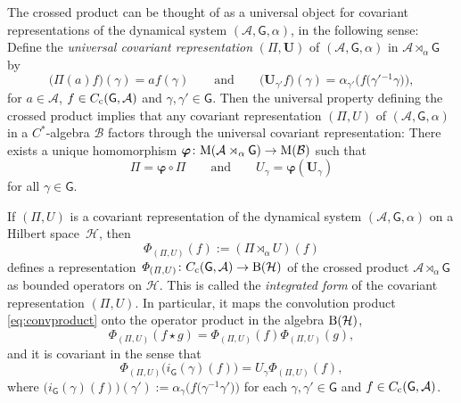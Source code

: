 \documentclass[10pt,a4paper]{amsart}
\numberwithin{equation}{section}
\newcommand{\mbf}[1]{{\boldsymbol {#1} }}
\newcommand{\sfG}{\mathsf{G}}
\newcommand{\Pim}{{\mathit\Pi}}
\def\alg{{\mathcal A}}
\def\balg{{\mathcal B}}
\def\hil{{\mathcal H}}
\begin{document}
The crossed product can be thought of as a universal
object for covariant representations of the dynamical system
$(\alg,\sfG,\alpha)$, in the following sense: Define the \emph{universal
 covariant representation} $(\mbf\Pim,\mbf U)$ of $(\alg,\sfG,\alpha)$
in $\alg\rtimes_\alpha \sfG$ by
\[
\big(\mbf\Pim(a)f\big)(\gamma)=a f(\gamma) \qquad \mbox{and} \qquad
\big(\mbf U_{\gamma'}f\big)(\gamma) =
\alpha_{\gamma'}\big(f\big(\gamma'{}^{-1} \gamma\big)\big) ,
\]
for $a\in\alg$, $f\in C_{\rm c}(\sfG,\alg)$ and $\gamma,\gamma'\in \sfG$. Then the
universal property defining the crossed product implies that any covariant representation $(\Pim,U)$ of
$(\alg,\sfG,\alpha)$ in a $C^*$-algebra $\balg$ factors through the
universal covariant representation: There exists a unique homomorphism
\mbox{$\mbf\varphi\colon {\rm M}(\alg\rtimes_\alpha \sfG)\to{\rm M}(\balg)$} such that
\[
\Pim=\mbf\varphi\circ\mbf\Pim \qquad \mbox{and} \qquad U_\gamma =
\mbf\varphi(\mbf U_\gamma)
\]
for all $\gamma\in \sfG$.

If $(\Pim,U)$ is a covariant representation of the dynamical system
$(\alg,\sfG,\alpha)$ on a Hilbert space~$\hil$, then
\[
{\mathit\Phi}_{(\Pim,U)}(f):=(\Pim\rtimes_\alpha U)(f)
\]
defines a representation ${\mathit\Phi}_{(\Pim,U)}\colon C_{\rm c}(\sfG,\alg)\to{\rm B}(\hil)$
of the crossed product $\alg\rtimes_\alpha \sfG$ as bounded operators on
$\hil$. This is called the \emph{integrated form} of the covariant
representation $(\Pim,U)$. In particular, it maps the convolution
product \eqref{eq:convproduct} onto the operator product in the
algebra ${\rm B}(\hil)$,
\[
{\mathit\Phi}_{(\Pim,U)}(f\star g) = {\mathit\Phi}_{(\Pim,U)}(f)
{\mathit\Phi}_{(\Pim,U)}(g) ,
\]
and it is covariant in the sense that
\[
{\mathit\Phi}_{(\Pim,U)}\big(i_\sfG(\gamma)(f)\big) = U_\gamma
{\mathit\Phi}_{(\Pim,U)}(f) ,
\]
where $\big(i_\sfG(\gamma)(f)\big)(\gamma'):=\alpha_\gamma\big(f\big(\gamma^{-1}
\gamma'\big)\big)$ for each $\gamma,\gamma'\in \sfG$ and $f\in C_{\rm
 c}(\sfG,\alg)$.
\end{document}

